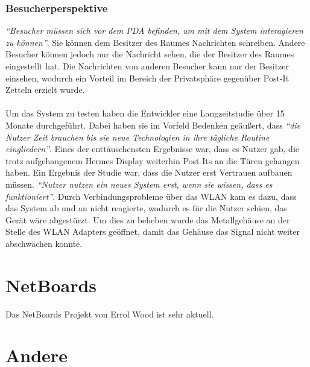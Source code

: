 \subsubsection{Besucherperspektive}
\textit{``Besucher müssen sich vor dem PDA befinden, um mit dem System interagieren zu können''}\cite{cheverest:2003:paper}. Sie können dem Besitzer des Raumes Nachrichten schreiben. Andere Besucher können jedoch nur die Nachricht sehen, die der Besitzer des Raumes eingestellt hat. Die Nachrichten von anderen Besucher kann nur der Besitzer einsehen, wodurch ein Vorteil im Bereich der Privatsphäre gegenüber Post-It Zetteln erzielt wurde.
\\
\\
Um das System zu testen haben die Entwickler eine Langzeitstudie über 15 Monate durchgeführt. Dabei haben sie im Vorfeld Bedenken geäußert, dass \textit{``die Nutzer Zeit brauchen bis sie neue Technologien in ihre tägliche Routine eingliedern''}\cite{cheverest:2003:paper}.
Eines der enttäuschensten Ergebnisse war, dass es Nutzer gab, die trotz aufgehangenem Hermes Display weiterhin Post-Its an die Türen gehangen haben\cite{cheverest:2003:paper}.
Ein Ergebnis der Studie war, dass die Nutzer erst Vertrauen aufbauen müssen. \textit{``Nutzer nutzen ein neues System erst, wenn sie wissen, dass es funktioniert''}\cite{cheverest:2003:paper}. Durch Verbindungsprobleme über das WLAN kam es dazu, dass das System ab und an nicht reagierte, wodurch es für die Nutzer schien, das Gerät wäre abgestürzt. Um dies zu beheben wurde das Metallgehäuse an der Stelle des WLAN Adapters geöffnet, damit das Gehäuse das Signal nicht weiter abschwächen konnte.







\section{NetBoards}
Das NetBoards Projekt von Errol Wood\cite{wood:2014} ist sehr aktuell.
\cite{netboards:website}


\section{Andere}

